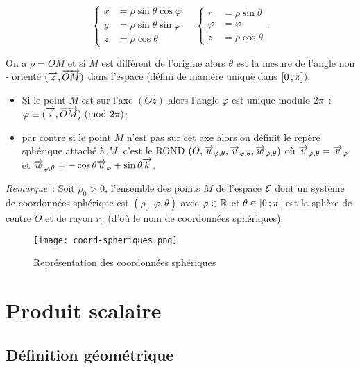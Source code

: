 \begin{equation}
  \begin{cases}
    x &= \rho\sin\theta\cos\varphi\\
    y &= \rho\sin\theta\sin\varphi\\ z &= \rho\cos\theta
  \end{cases}
  \quad
  \begin{cases}
    r &=\rho\sin\theta\\ \varphi&=\varphi\\ z&=\rho\cos\theta
  \end{cases}.
\end{equation}

On a \(\rho = OM\) et si \(M\) est différent de l'origine alors \(\theta\) est 
la mesure de l'angle non - orienté \((\overrightarrow{z},\overrightarrow{OM})\) dans l'espace 
(défini de manière unique dans \(\left[ 0 \, ;  \pi \right]\)).
\begin{itemize}
  \item Si le point \(M\) est sur l'axe \((Oz)\) alors l'angle \(\varphi\) est 
    unique modulo \(2\pi\)~: \(\varphi \equiv (\overrightarrow{i}, \overrightarrow{OM})\!\pmod {2\pi}\);
  \item par contre si le point \(M\) n'est pas sur cet axe alors on définit le 
    repère sphérique attaché à \(M\), c'est le ROND \((O, \overrightarrow{u}_{\varphi, 
    \theta},\overrightarrow{v}_{\varphi, \theta},\overrightarrow{w}_{\varphi, \theta})\) où \(\overrightarrow{v}_{\varphi, 
    \theta}=\overrightarrow{v}_{\varphi}\) et \(\overrightarrow{w}_{\varphi, \theta}=-\cos\theta\overrightarrow{u}_\varphi + 
    \sin\theta\overrightarrow{k}\).
\end{itemize}

\emph{Remarque}~: Soit \(\rho_0>0\), l'ensemble des points \(M\) de l'espace 
\(\mathcal{E}\) dont un système de coordonnées sphérique est \((\rho_0, \varphi, 
\theta)\) avec \(\varphi\in\mathbb{R}\) et \(\theta\in \left[ 0 \, ;  \pi \right]\) est la 
sphère de centre \(O\) et de rayon \(r_0\) (d'où le nom de coordonnées 
sphériques).

\begin{figure}
  \centering
  \texttt{[image: coord-spheriques.png]}
  \caption{Représentation des coordonnées sphériques}
  \label{fig:repsphere}
\end{figure}

\section{Produit scalaire}

\subsection{Définition géométrique}

